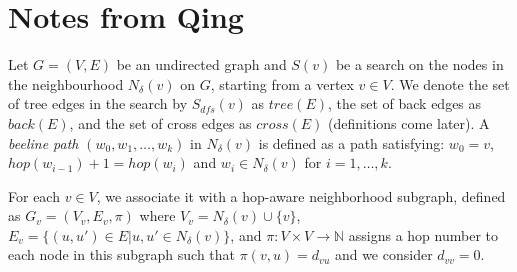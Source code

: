 \clearpage
\section{Notes from Qing}

Let $G=(V,E)$ be an undirected graph and $S(v)$ be a search on the nodes in the  neighbourhood $N_{\delta}(v)$ on $G$, starting from a vertex $v\in V$. We denote the set of tree edges in the search by $S_{dfs}(v)$ as $tree(E)$, the set of back edges as $back(E)$, and the set of cross edges as $cross(E)$ (definitions come later). A \emph{beeline path} $(w_0,w_1,\dots,w_k)$ in $N_{\delta}(v)$ is defined as a path satisfying: $w_0=v$, $hop(w_{i-1})+1=hop(w_{i})$ and $w_i\in N_{\delta}(v)$ for $i=1,\dots, k$.

For each $v\in V$, we associate it with a hop-aware neighborhood subgraph, defined as $G_v=(V_v, E_v, \pi)$ where $V_v=N_{\delta}(v)\cup \{v\}$, $E_v=\{(u,u')\in E|u,u'\in N_{\delta}(v)\}$, and $\pi: V\times V\rightarrow\mathbb{N}$ assigns a hop number to each node in this subgraph such that $\pi(v,u)=d_{vu}$ and we consider $d_{vv}=0$.

